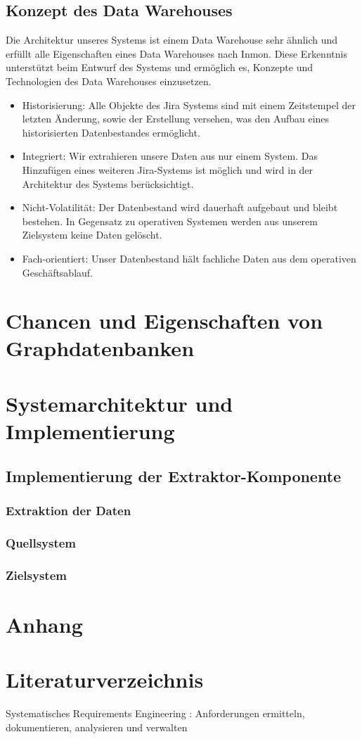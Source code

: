 \documentclass[10pt]{article}
\begin{document}
\subsection{Konzept des Data Warehouses}
Die Architektur unseres Systems ist einem Data Warehouse sehr ähnlich und erfüllt alle Eigenschaften eines Data Warehouses nach Inmon. Diese Erkenntnis unterstützt beim Entwurf des Systems und ermöglich es, Konzepte und Technologien des Data Warehouses einzusetzen.
\begin{itemize}
  \item Historisierung: Alle Objekte des Jira Systems sind mit einem Zeitstempel der letzten Änderung, sowie der Erstellung versehen, was den Aufbau eines historisierten Datenbestandes ermöglicht.
  \item Integriert: Wir extrahieren unsere Daten aus nur einem System. Das Hinzufügen eines weiteren Jira-Systems ist möglich und wird in der Architektur des Systems berücksichtigt.
  \item Nicht-Volatilität: Der Datenbestand wird dauerhaft aufgebaut und bleibt bestehen. In Gegensatz zu operativen Systemen werden aus unserem Zielsystem keine Daten gelöscht.
  \item Fach-orientiert: Unser Datenbestand hält fachliche Daten aus dem operativen Geschäftsablauf.
\end{itemize}
\section{Chancen und Eigenschaften von Graphdatenbanken}
\newpage
\section{Systemarchitektur und Implementierung}
\subsection{Implementierung der Extraktor-Komponente}
\subsubsection{Extraktion der Daten}
\subsubsection{Quellsystem}
\subsubsection{Zielsystem}
\subsection{}
\section{Anhang}
\newpage
\section{Literaturverzeichnis}
Systematisches Requirements Engineering : Anforderungen ermitteln, dokumentieren, analysieren und verwalten 
\end{document}
